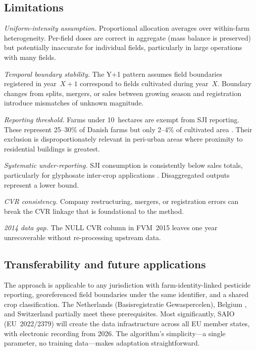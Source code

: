 \documentclass[12pt,a4paper]{article}
\begin{document}
\subsection{Limitations}

\textit{Uniform-intensity assumption.} Proportional allocation averages over within-farm heterogeneity. Per-field doses are correct in aggregate (mass balance is preserved) but potentially inaccurate for individual fields, particularly in large operations with many fields.

\textit{Temporal boundary stability.} The Y+1 pattern assumes field boundaries registered in year~$X+1$ correspond to fields cultivated during year~$X$. Boundary changes from splits, mergers, or sales between growing season and registration introduce mismatches of unknown magnitude.

\textit{Reporting threshold.} Farms under 10~hectares are exempt from SJI reporting. These represent 25--30\% of Danish farms but only 2--4\% of cultivated area \cite{dst2023}. Their exclusion is disproportionately relevant in peri-urban areas where proximity to residential buildings is greatest.

\textit{Systematic under-reporting.} SJI consumption is consistently below sales totals, particularly for glyphosate inter-crop applications \cite{mst2023}. Disaggregated outputs represent a lower bound.

\textit{CVR consistency.} Company restructuring, mergers, or registration errors can break the CVR linkage that is foundational to the method.

\textit{2014 data gap.} The NULL CVR column in FVM~2015 leaves one year unrecoverable without re-processing upstream data.

\subsection{Transferability and future applications}

The approach is applicable to any jurisdiction with farm-identity-linked pesticide reporting, georeferenced field boundaries under the same identifier, and a shared crop classification. The Netherlands (Basisregistratie Gewaspercelen), Belgium \cite{zucchini2022}, and Switzerland \cite{moehring2020} partially meet these prerequisites. Most significantly, SAIO (EU~2022/2379) will create the data infrastructure across all EU member states, with electronic recording from 2026. The algorithm's simplicity---a single parameter, no training data---makes adaptation straightforward.
\end{document}
